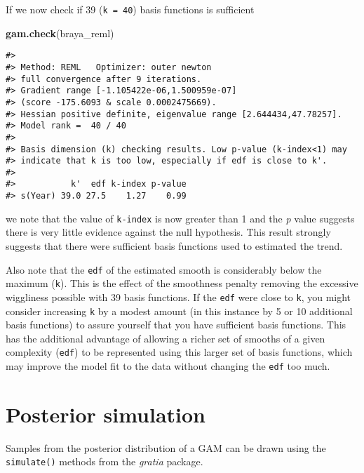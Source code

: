\documentclass[12pt,]{article}
\newenvironment{Shaded}{\begin{snugshade}}{\end{snugshade}}
\newcommand{\KeywordTok}[1]{\textcolor[rgb]{0.13,0.29,0.53}{\textbf{{#1}}}}
\newcommand{\NormalTok}[1]{{#1}}
\begin{document}
If we now check if 39 (\texttt{k\ =\ 40}) basis functions is sufficient

\begin{Shaded}
\begin{Highlighting}[]
\KeywordTok{gam.check}\NormalTok{(braya_reml)}
\end{Highlighting}
\end{Shaded}

\begin{verbatim}
#> 
#> Method: REML   Optimizer: outer newton
#> full convergence after 9 iterations.
#> Gradient range [-1.105422e-06,1.500959e-07]
#> (score -175.6093 & scale 0.0002475669).
#> Hessian positive definite, eigenvalue range [2.644434,47.78257].
#> Model rank =  40 / 40 
#> 
#> Basis dimension (k) checking results. Low p-value (k-index<1) may
#> indicate that k is too low, especially if edf is close to k'.
#> 
#>           k'  edf k-index p-value
#> s(Year) 39.0 27.5    1.27    0.99
\end{verbatim}

we note that the value of \texttt{k-index} is now greater than 1 and the
\emph{p} value suggests there is very little evidence against the null
hypothesis. This result strongly suggests that there were sufficient
basis functions used to estimated the trend.

Also note that the \texttt{edf} of the estimated smooth is considerably
below the maximum (\texttt{k\textquotesingle{}}). This is the effect of
the smoothness penalty removing the excessive wiggliness possible with
39 basis functions. If the \texttt{edf} were close to
\texttt{k\textquotesingle{}}, you might consider increasing \texttt{k}
by a modest amount (in this instance by 5 or 10 additional basis
functions) to assure yourself that you have sufficient basis functions.
This has the additional advantage of allowing a richer set of smooths of
a given complexity (\texttt{edf}) to be represented using this larger
set of basis functions, which may improve the model fit to the data
without changing the \texttt{edf} too much.

\section{Posterior simulation}\label{posterior-simulation}

Samples from the posterior distribution of a GAM can be drawn using the
\texttt{simulate()} methods from the \emph{gratia} package.
\end{document}
